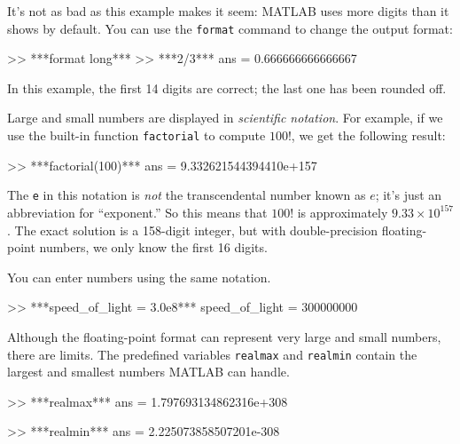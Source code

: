  

It's not as bad as this example makes it seem: MATLAB uses more digits than it shows by default.
You can use the \lstinline{format} command to change the output format:


\begin{code}
>> ***format long***
>> ***2/3***
ans = 0.666666666666667
\end{code}

In this example, the first 14 digits are correct; the last one has been rounded off.


Large and small numbers are displayed in \emph{scientific notation}. 
For example, if we use the built-in function \lstinline{factorial} to compute $100!$, we get the following result:

\begin{code}
>> ***factorial(100)***
ans = 9.332621544394410e+157
\end{code}

The \lstinline{e} in this notation is \emph{not} the transcendental number
known as $e$; it's just an abbreviation for ``exponent.''  So
this means that $100!$ is approximately $9.33 \times 10^{157}$.  The
exact solution is a 158-digit integer, but with double-precision floating-point numbers, we only know the first 16 digits.


You can enter numbers using the same notation.

\begin{code}
>> ***speed_of_light = 3.0e8***
speed_of_light = 300000000
\end{code}

Although the floating-point format can represent very large and small numbers, 
there are limits.  
The predefined variables \lstinline{realmax} and \lstinline{realmin}
contain the largest and smallest numbers MATLAB 
can handle.


\begin{code}
>> ***realmax***
ans = 1.797693134862316e+308

>> ***realmin***
ans = 2.225073858507201e-308
\end{code}

